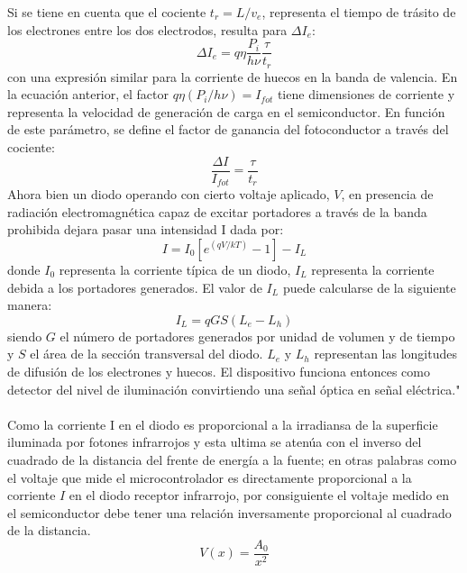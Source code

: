 \documentclass[12]{article}
\begin{document}
\begin{multicols}{2}
\begin{equation}
\end{equation}
Si se tiene en cuenta que el cociente $t_{r} = L/v_{e}$, representa el tiempo de trásito de los electrones entre los dos electrodos, resulta para $\Delta I_{e}$:
\begin{equation}
\Delta I_{e} = q\eta \frac{P_{i}}{h\nu}\frac{\tau}{t_{r}}
\end{equation}
con una expresión similar para la corriente de huecos en la banda de valencia. En la ecuación anterior, el factor $q\eta(P_{i}/h\nu) = I_{fot}$ tiene dimensiones de corriente y representa la velocidad de generación de carga en el semiconductor. En función de este parámetro, se define el factor de ganancia del fotoconductor a través del cociente:
\begin{equation}
\frac{\Delta I}{I_{fot}} = \frac{\tau}{t_{r}}
\end{equation}
Ahora bien un diodo operando con cierto voltaje aplicado, $V$, en presencia de radiación electromagnética  capaz de excitar portadores a través de la banda prohibida dejara pasar una intensidad I dada por:
\begin{equation}
I = I_{0}[e^{(qV/kT)}-1] - I_{L}
\end{equation}
donde $I_{0}$ representa la corriente típica de un diodo, $I_{L}$ representa la corriente debida a  los portadores generados. El valor de $I_{L}$ puede calcularse de la siguiente manera:
\begin{equation}
I_{L} = qGS(L_{e} - L_{h})
\end{equation}
siendo $G$ el número de portadores generados por unidad de volumen y de tiempo y $S$ el área de la sección transversal del diodo. $L_{e}$ y $L_{h}$ representan las longitudes de difusión de los electrones y huecos. El dispositivo funciona entonces como detector del nivel de iluminación  convirtiendo una señal óptica en señal eléctrica." \cite{FOTOELECTRICO}\\ \\ 
Como la corriente I en el diodo es proporcional a la irradiansa de la superficie iluminada por fotones infrarrojos y esta ultima se atenúa con el inverso del cuadrado de la distancia del frente de energía a la fuente; en otras palabras como el voltaje que mide el microcontrolador es directamente proporcional a la corriente $I$ en el diodo receptor infrarrojo, por consiguiente el voltaje medido en el semiconductor debe  tener una relación inversamente proporcional al cuadrado de la distancia.
\begin{equation}
V(x) = \frac{A_{0}}{x^{2}}
\end{equation}

\end{multicols}
\end{document}
